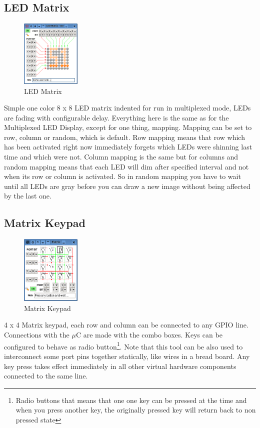 \documentclass[a4paper,twoside,12pt]{book}
\newcommand{\uC}{$\mu$C }
\begin{document}
		\subsection{LED Matrix}
			\begin{figure}
				\centering{}
				\includegraphics[width=80pt]{img/014.png}
				\caption{LED Matrix}
			\end{figure}
			Simple one color 8 x 8 LED matrix indented for run in multiplexed mode, LEDs are fading with configurable delay. Everything here is the same as for the Multiplexed LED Display, except for one thing, mapping. Mapping can be set to row, column or random, which is default. Row mapping means that row which has been activated right now immediately forgets which LEDs were shinning last time and which were not. Column mapping is the same but for columns and random mapping means that each LED will dim after specified interval and not when its row or column is activated. So in random mapping you have to wait until all LEDs are gray before you can draw a new image without being affected by the last one.

		\subsection{Matrix Keypad}
			\begin{figure}
				\centering{}
				\includegraphics[width=80pt]{img/013.png}
				\caption{Matrix Keypad}
			\end{figure}
			4 x 4 Matrix keypad, each row and column can be connected to any GPIO line. Connections with the \uC are made with the combo boxes. Keys can be configured to behave as radio button\footnote{Radio buttons that means that one one key can be pressed at the time and when you press another key, the originally pressed key will return back to non pressed state}. Note that this tool can be also used to interconnect some port pins together statically, like wires in a bread board. Any key press takes effect immediately in all other virtual hardware components connected to the same line.
\end{document}
